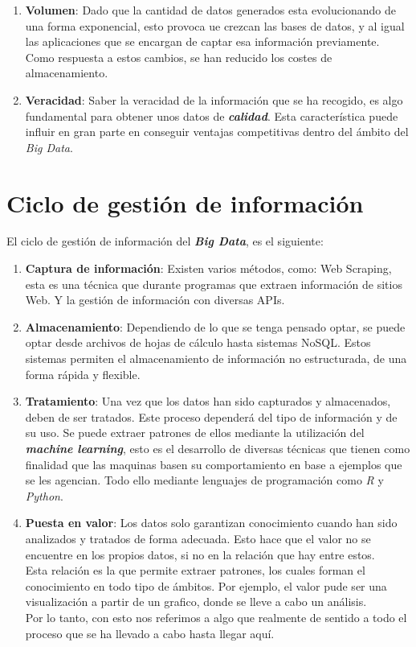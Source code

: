 \documentclass[11pt]{diazessay} %
\begin{document}
\begin{enumerate}
	\item \textbf{Volumen}: Dado que la cantidad de datos generados esta evolucionando de una forma exponencial, esto provoca ue crezcan las bases de datos, y al igual las aplicaciones que se encargan de captar esa información previamente. Como respuesta a estos cambios, se han reducido los costes de almacenamiento.
	
	\item \textbf{Veracidad}: Saber la veracidad de la información que se ha recogido, es algo fundamental para obtener unos datos de \textit{\textbf{calidad}}.  Esta característica puede influir en gran parte en conseguir ventajas competitivas dentro del ámbito del \textit{Big Data}.
\end{enumerate}


\newpage
\section*{Ciclo de gestión de información}
El ciclo de gestión de información del \textit{\textbf{Big Data}}, es el siguiente:

\begin{enumerate}
	\item \textbf{Captura de información}: Existen varios métodos, como: Web Scraping, esta es una técnica que durante programas que extraen información de sitios Web. Y la gestión de información con diversas APIs.
	
	\item \textbf{Almacenamiento}: Dependiendo de lo que se tenga pensado optar, se puede optar desde archivos de hojas de cálculo hasta sistemas NoSQL. Estos sistemas permiten el almacenamiento de información no estructurada, de una forma rápida y flexible.
	
	\item \textbf{Tratamiento}: Una vez que los datos han sido capturados y almacenados, deben de ser tratados. Este proceso dependerá del tipo de información y de su uso. Se puede extraer patrones de ellos mediante la utilización del \textit{\textbf{machine learning}}, esto es el desarrollo de diversas técnicas que tienen como finalidad que las maquinas basen su comportamiento en base a ejemplos que se les agencian. Todo ello mediante lenguajes de programación como \textit{R} y \textit{Python}.
	
	\item \textbf{Puesta en valor}: Los datos solo garantizan conocimiento cuando han sido analizados y tratados de forma adecuada. Esto hace que el valor no se encuentre en los propios datos, si no en la relación que hay entre estos.\\
	Esta relación es la que permite extraer patrones, los cuales forman el conocimiento en todo tipo de ámbitos. Por ejemplo, el valor pude ser una visualización a partir de un grafico, donde se lleve a cabo un análisis.\\
	Por lo tanto, con esto nos referimos a algo que realmente de sentido a todo el proceso que se ha llevado a cabo hasta llegar aquí.
\end{enumerate}
\end{document}
